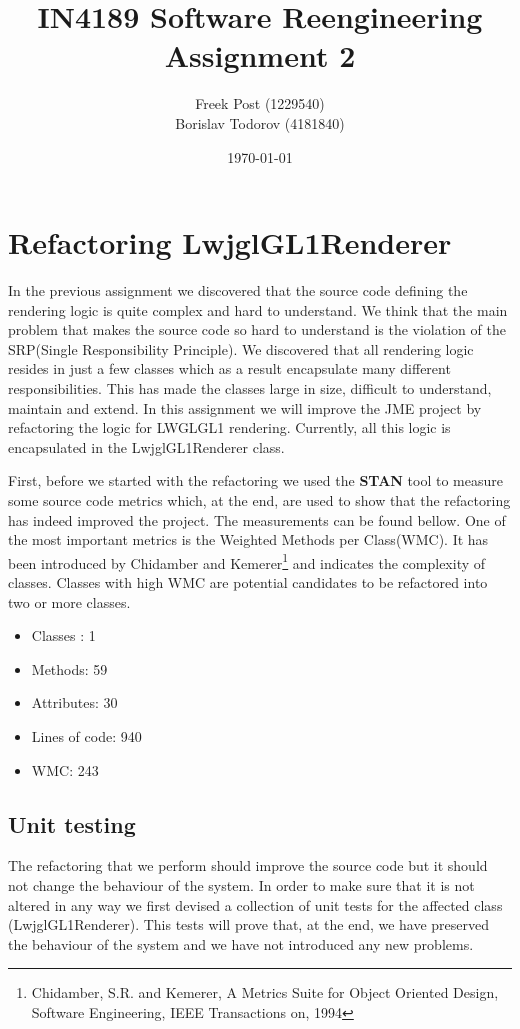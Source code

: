 \documentclass[a4paper, notitlepage]{article}
\begin{document}
\title{IN4189 Software Reengineering \\ Assignment 2}
\author{Freek Post (1229540) \\ Borislav Todorov (4181840)}
\date{\today}
\maketitle

\section{Refactoring LwjglGL1Renderer}

In the previous assignment we discovered that the source code defining the rendering logic is quite complex and hard to understand. We think that the main problem that makes the source code so hard to understand is the violation of the SRP(Single Responsibility Principle). We discovered that all rendering logic resides in just a few classes which as a result encapsulate many different responsibilities. This has made the classes large in size, difficult to understand, maintain and extend. In this assignment we will improve the JME project by refactoring the logic for LWGLGL1 rendering. Currently, all this logic is encapsulated in the LwjglGL1Renderer class. 

First, before we started with the refactoring we used the \textbf{STAN} tool to measure some source code metrics which, at the end, are used to show that the refactoring has indeed improved the project. The measurements can be found bellow. One of the most important metrics is the Weighted Methods per Class(WMC). It has been introduced by Chidamber and Kemerer\footnote{Chidamber, S.R. and Kemerer, A Metrics Suite for Object Oriented Design, Software Engineering, IEEE Transactions on, 1994 } and indicates the complexity of classes. Classes with high WMC are potential candidates to be refactored into two or more classes.

\begin{itemize}
\item Classes : 1
\item Methods: 59
\item Attributes: 30
\item Lines of code: 940
\item WMC: 243
\end{itemize}

\subsection{Unit testing} 
The refactoring that we perform should improve the source code but it should not change the behaviour of the system. In order to make sure that it is not altered in any way we first devised a collection of unit tests for the affected class (LwjglGL1Renderer). This tests will prove that, at the end, we have preserved the behaviour of the system and we have not introduced any new problems.
\end{document}
